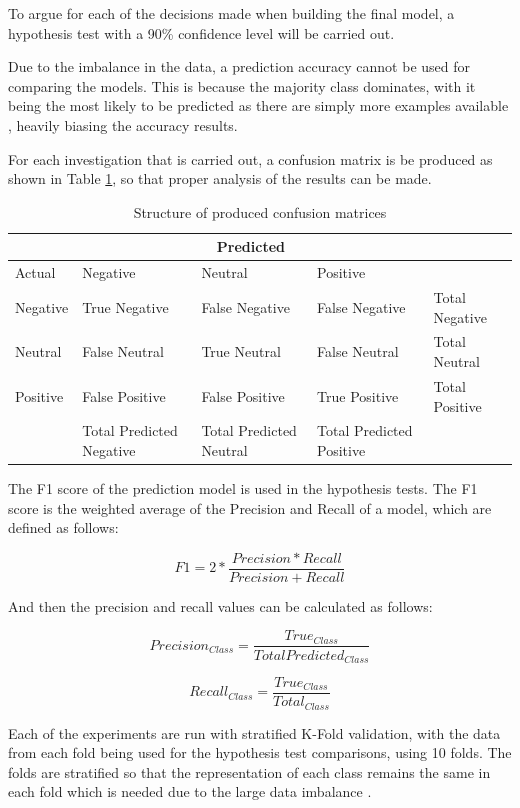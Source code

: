 To argue for each of the decisions made when building the final model, a hypothesis test with a 90\% confidence level will be carried out.

Due to the imbalance in the data, a prediction accuracy cannot be used for comparing the models. This is because the majority class dominates, with it being the most likely to be predicted as there are simply more examples available \cite{al2015applied}, heavily biasing the accuracy results.

For each investigation that is carried out, a confusion matrix is be produced as shown in Table \ref{conmat}, so that proper analysis of the results can be made.

\begin{table}
\centering
\caption{Structure of produced confusion matrices}
\begin{tabular}{ |p{3cm}|p{3cm}|p{3cm}|p{3cm}|p{3cm}| }
 \hline
  & \multicolumn{3}{|c|}{Predicted} &\\
 \hline
   Actual & Negative & Neutral & Positive &\\
    \hline
    Negative &  True Negative   &  False Negative  & False Negative & Total Negative\\
    Neutral & False Neutral & True Neutral&  False Neutral & Total Neutral \\
    Positive & False Positive & False Positive &  True Positive & Total Positive\\
    \hline
    & Total Predicted Negative & Total Predicted Neutral & Total Predicted Positive & \\
 \hline
\end{tabular}
\label{conmat}
\end{table}

The F1 score of the prediction model is used in the hypothesis tests. The F1 score is the weighted average of the Precision and Recall of a model, which are defined as follows: 

$$ F1 = 2 * \frac{Precision * Recall}{Precision + Recall} $$

And then the precision and recall values can be calculated as follows:

$$ Precision_{Class} = \frac{True_{Class}}{Total Predicted_{Class}} $$

$$ Recall_{Class} = \frac{True_{Class}}{Total_{Class}} $$

Each of the experiments are run with stratified K-Fold validation, with the data from each fold being used for the hypothesis test comparisons, using 10 folds. The folds are stratified so that the representation of each class remains the same in each fold which is needed due to the large data imbalance \cite{kohavi1995study}.

